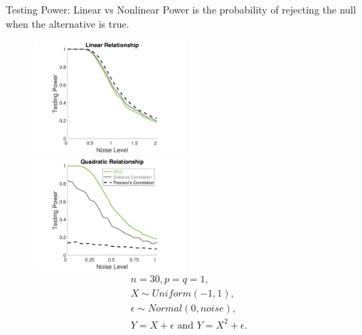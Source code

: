 \documentclass[mathserif,t]{beamer}
\newcommand{\Mgc}{MGC}
\begin{document}
\begin{frame}{Testing Power: Linear vs Nonlinear}
Power is the probability of rejecting the null when the alternative is true.
\pause
\begin{figure}[!ht]
\centering
\includegraphics[width=0.5\textwidth,trim={1.5cm 0 0cm 0cm},clip]{FigNoiseT1}
\includegraphics[width=0.5\textwidth,trim={1.5cm 0 0cm 0cm},clip]{FigNoiseT6}
\label{f:noise}
\begin{align*}
& n=30, p=q=1, \\
& X \sim Uniform(-1,1),\\
& \epsilon \sim Normal(0, noise), \\
& Y=X+\epsilon \mbox{ and } Y=X^{2}+\epsilon.
\end{align*}
\end{figure}
\end{frame}

\end{document}
